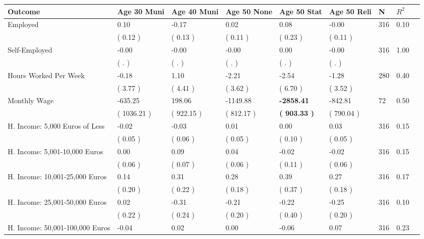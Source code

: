 \begin{tabular}{L{6.2cm} C{1.8cm} C{1.8cm} C{1.8cm} C{1.8cm} C{1.8cm} C{1.8cm} C{0.3cm} C{0.3cm}}
\toprule
 \textbf{Outcome} & \textbf{Age 30 Muni} & \textbf{Age 40 Muni} & \textbf{Age 50 None} & \textbf{Age 50 Stat} & \textbf{Age 50 Reli} & \textbf{N} & \textbf{$ R^2$} \\
\midrule
Employed &      0.10 &     -0.17 &      0.02 &      0.08 &     -0.00  & 316 &       0.10 \\ 
 & (     0.12 ) & (     0.13 ) & (     0.11 ) & (     0.23 ) & (     0.11 )  & \\
Self-Employed &     -0.00 &     -0.00 &     -0.00 &      0.00 &     -0.00  & 316 &       1.00 \\ 
 & (        . ) & (        . ) & (        . ) & (        . ) & (        . )  & \\
Hours Worked Per Week &     -0.18 &      1.10 &     -2.21 &     -2.54 &     -1.28  & 280 &       0.40 \\ 
 & (     3.77 ) & (     4.41 ) & (     3.62 ) & (     6.70 ) & (     3.52 )  & \\
Monthly Wage &   -635.25 &    198.06 &  -1149.88 & \textbf{ -2858.41} &   -842.81  & 72 &       0.50 \\ 
 & (  1036.21 ) & (   922.15 ) & (   812.17 ) & \textbf{(   903.33 )} & (   790.04 )  & \\
H. Income: 5,000 Euros of Less &     -0.02 &     -0.03 &      0.01 &      0.00 &      0.03  & 316 &       0.15 \\ 
 & (     0.05 ) & (     0.06 ) & (     0.05 ) & (     0.10 ) & (     0.05 )  & \\
H. Income: 5,001-10,000 Euros &      0.00 &      0.09 &      0.04 &     -0.02 &     -0.02  & 316 &       0.15 \\ 
 & (     0.06 ) & (     0.07 ) & (     0.06 ) & (     0.11 ) & (     0.06 )  & \\
H. Income: 10,001-25,000 Euros &      0.14 &      0.31 &      0.28 &      0.39 &      0.27  & 316 &       0.17 \\ 
 & (     0.20 ) & (     0.22 ) & (     0.18 ) & (     0.37 ) & (     0.18 )  & \\
H. Income: 25,001-50,000 Euros &      0.02 &     -0.31 &     -0.21 &     -0.22 &     -0.25  & 316 &       0.10 \\ 
 & (     0.22 ) & (     0.24 ) & (     0.20 ) & (     0.40 ) & (     0.20 )  & \\
H. Income: 50,001-100,000 Euros &     -0.04 &      0.02 &      0.00 &     -0.06 &      0.07  & 316 &       0.23 \\ 

\end{tabular}
